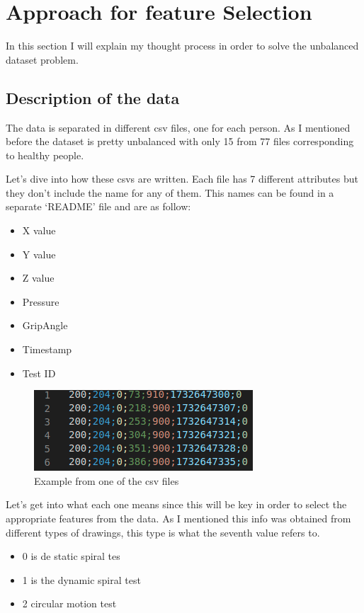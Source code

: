 \documentclass{article} %
\begin{document}
\section{Approach for feature Selection}
 
 In this section I will explain my thought process in order to solve the unbalanced dataset problem.
 
\subsection{Description of the data}
  The data is separated in different csv files, one for each person. As I mentioned before the dataset is pretty unbalanced with only 15 from 77 files corresponding to healthy people.

Let's dive into how these csvs are written. Each file has 7 different attributes but they don't include the name for any of them. This names can be found in a separate ‘README’ file and are as follow:

\begin{itemize}
  \item X value
  \item Y value
  \item Z value 
  \item Pressure
  \item GripAngle
  \item Timestamp
  \item Test ID
\end{itemize}

\begin{figure}[h!]
  \includegraphics[scale = 1]{csv.png}
  \centering
  \caption{Example from one of the csv files}\hspace*{\fill}
  \label{fig:a}
\end{figure}



Let's get into what each one means since this will be key in order to select the appropriate features from the data. As I mentioned this info was obtained from different types of drawings, this type is what the seventh value refers to.

\begin{itemize}
  \item  0 is de static spiral tes
  \item 1 is the dynamic spiral test
  \item 2 circular motion test
\end{itemize}
\end{document}
